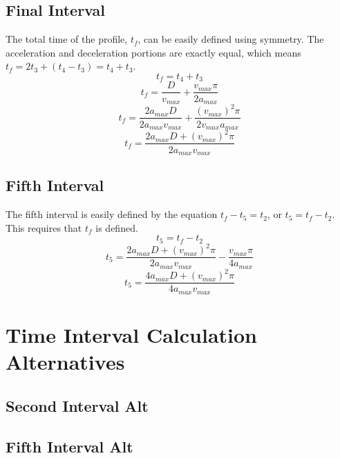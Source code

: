 \documentclass[a4paper,12pt]{report}
\newcommand{\tab}{\hspace{20pt}}
\begin{document}
	\section{Final Interval}
	\tab The total time of the profile, $t_f$, can be easily defined using symmetry. The acceleration and deceleration portions are exactly equal, which means $t_f = 2t_3 + (t_4 - t_3) = t_4 + t_3$.
	\[t_f = t_4 + t_3\]
	\[t_f = \frac{D}{v_{max}} + \frac{v_{max}\pi}{2a_{max}}\]
	\[t_f = \frac{2a_{max}D}{2a_{max}v_{max}} + \frac{(v_{max})^2\pi}{2v_{max}a_{max}}\]
	\[t_f = \frac{2a_{max}D + (v_{max})^2\pi}{2a_{max}v_{max}}\]
	
	\section{Fifth Interval}
	\tab The fifth interval is easily defined by the equation $t_f - t_5 = t_2$, or $t_5 = t_f - t_2$. This requires that $t_f$ is defined.
	\[t_5 = t_f - t_2\]
	\[t_5 = \frac{2a_{max}D + (v_{max})^2\pi}{2a_{max}v_{max}} - \frac{v_{max}\pi}{4a_{max}}\]
	\[t_5 = \frac{4a_{max}D + (v_{max})^2\pi}{4a_{max}v_{max}}\]
	
	\chapter{Time Interval Calculation Alternatives}
	\section{Second Interval Alt}
	\section{Fifth Interval Alt}
	
\end{document}
